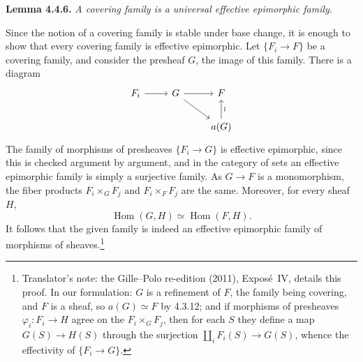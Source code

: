 \medskip
\noindent{}\textbf{Lemma 4.4.6.}
\textit{A covering family is a universal effective epimorphic family.}

Since the notion of a covering family is stable under base change, it is
enough to show that every covering family is effective epimorphic. Let
\(\{F_i\to F\}\) be a covering family, and consider the presheaf \(G\), the
image of this family. There is a diagram
\[
\begin{tikzcd}
 F_i \arrow[r] & G \arrow[r] \arrow[dr] & F\\
 & & a(G) \arrow[u,"\wr"']
\end{tikzcd}
\]
The family of morphisms of presheaves \(\{F_i\to G\}\) is effective
epimorphic, since this is checked argument by argument, and in the category
of sets an effective epimorphic family is simply a surjective family. As
\(G\to F\) is a monomorphism, the fiber products \(F_i\times_GF_j\) and
\(F_i\times_FF_j\) are the same. Moreover, for every sheaf \(H\),
\[
 \operatorname{Hom}(G,H)\simeq\operatorname{Hom}(F,H).
\]
It follows that the given family is indeed an effective epimorphic family of
morphisms of sheaves.\footnote{Translator's note: the Gille--Polo re-edition (2011), Expos\'e~IV, details
this proof. In our formulation: \(G\) is a refinement of \(F\), the family
being covering, and \(F\) is a sheaf, so \(a(G)\simeq F\) by 4.3.12; and if
morphisms of presheaves \(\varphi_i\colon F_i\to H\) agree on the
\(F_i\times_GF_j\), then for each \(S\) they define a map \(G(S)\to H(S)\)
through the surjection \(\coprod_iF_i(S)\to G(S)\), whence the effectivity of
\(\{F_i\to G\}\).}
